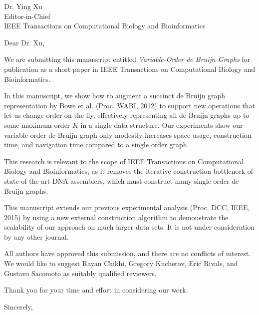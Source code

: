 \documentclass{letter}
\makeatletter
\renewcommand{\closing}[1]{\par\nobreak\vspace{\parskip}%
  \stopbreaks
  \noindent
  \ifx\@empty\fromaddress\else
  \hspace*{\longindentation}\fi
  \parbox{\indentedwidth}{\raggedright
       \ignorespaces #1\\[3\medskipamount]%
       \ifx\@empty\fromsig
           \fromname
       \else \fromsig \fi\strut}%
   \par}
\makeatother
\begin{document}
\begin{letter}{Dr. Ying Xu \\ Editor-in-Chief \\ IEEE Transactions on Computational Biology and Bioinformatics}
\opening{Dear Dr. Xu,}

We are submitting this manuscript entitled \textit{Variable-Order de Bruijn Graphs}
for publication as a short paper in IEEE Transactions on Computational Biology
and Bioinformatics.

In this manuscript, we show how to augment a succinct de Bruijn graph
representation by Bowe et al. (Proc. WABI, 2012) to support new operations that
let us change order on the fly, effectively representing all de Bruijn graphs up
to some maximum order $K$ in a single data structure. Our experiments show
our variable-order de Bruijn graph only modestly increases space usage,
construction time, and navigation time compared to a single order graph.

This research is relevant to the scope of IEEE Transactions on Computational Biology
and Bioinformatics, as it removes the iterative construction bottleneck of
state-of-the-art DNA assemblers, which must construct many single order
de Bruijn graphs.

This manuscript extends our previous experimental analysis (Proc. DCC, IEEE, 2015)
by using a new external construction algorithm to demonstrate the scalability of
our approach on much larger data sets. It is not under consideration by any other
journal.

All authors have approved this submission, and there are no conflicts of
interest. We would like to suggest Rayan Chikhi, Gregory Kucherov, Eric Rivals,
and Gustavo Sacomoto as suitably qualified reviewers.

Thank you for your time and effort in considering our work.

\closing{Sincerely,}
\end{letter}
\end{document}
